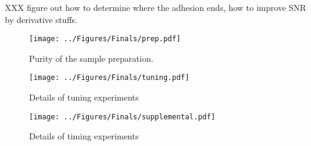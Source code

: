 \documentclass[%
  aip,12pt,tightenlines,
  amsthm,
 amsmath,amssymb
]{article}
\newcommand{\fLabel}[1]{\label{figure:#1}}
\newcommand{\pEndF}[0]{ \\ }
\newcommand{\pStartF}[0]{ }
\newcommand{\figwidth}[0]{\linewidth}
\begin{document}
XXX figure out how to determine where the adhesion ends, how to improve SNR by derivative stuffs.


\begin{figure}
\centering
\texttt{[image: ../Figures/Finals/prep.pdf]}%
\caption[Verification of sample purity]{\noindent\fLabel{Prep}\pStartF Purity of the sample preparation. \pEndF }
\end{figure}


\begin{figure}
\centering
\texttt{[image: ../Figures/Finals/tuning.pdf]}%
\caption[Cross validation of algorithms and optimal parameters]{\noindent\fLabel{Tuning}\pStartF Details of tuning experiments\pEndF }
\end{figure}



\begin{figure}
\centering
\texttt{[image: ../Figures/Finals/supplemental.pdf]}%
\caption[Algorithmic runtime versus loading rate]{\noindent\fLabel{Timing_Details}\pStartF Details of timing experiments\pEndF }
\end{figure}
\end{document}
